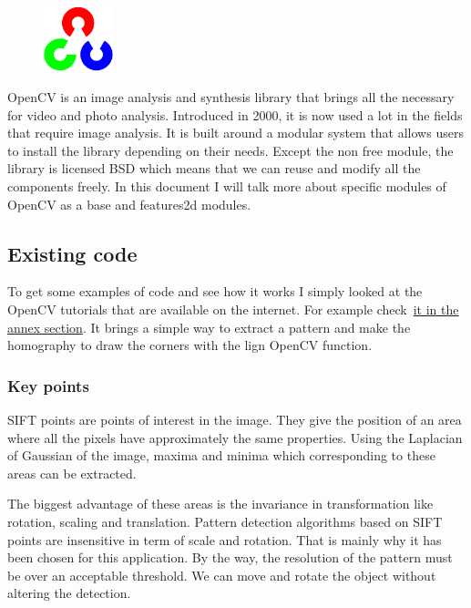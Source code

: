 		\begin{figure}
	\vspace{-7mm}
	\includegraphics[width=2cm]{images_not_compressed/opencv_logo.png}
	\end{figure}
	\par OpenCV is an image analysis and synthesis library that brings all the necessary for video and photo analysis. Introduced in 2000, it is now used a lot in the fields that require image analysis.
 It is built around a modular system that allows users to install the library depending on their needs.
 Except the non free module, the library is licensed BSD which means that we can reuse and modify all the components freely.
 In this document I will talk more about specific modules of OpenCV as a base and features2d modules.
	
	\subsection{Existing code}
	
	\par To get some examples of code and see how it works I simply looked at the OpenCV tutorials that are available on the internet. For example check~\hyperlink{opencv}{it in the annex section}. It brings a simple way to extract a pattern and make the homography to draw the corners with the lign OpenCV function.
	
	\subsubsection{Key points}
	\par SIFT points are points of interest in the image. They give the position of an area where all the pixels have approximately the same properties. Using the Laplacian of Gaussian of the image, maxima and minima which corresponding to these areas can be extracted.
	\par The biggest advantage of these areas is the invariance in transformation like rotation, scaling and translation. Pattern detection algorithms based on SIFT points are insensitive in term of scale and rotation. That is mainly why it has been chosen for this application. By the way, the resolution of the pattern must be over an acceptable threshold. We can move and rotate the object without altering the detection.
	
